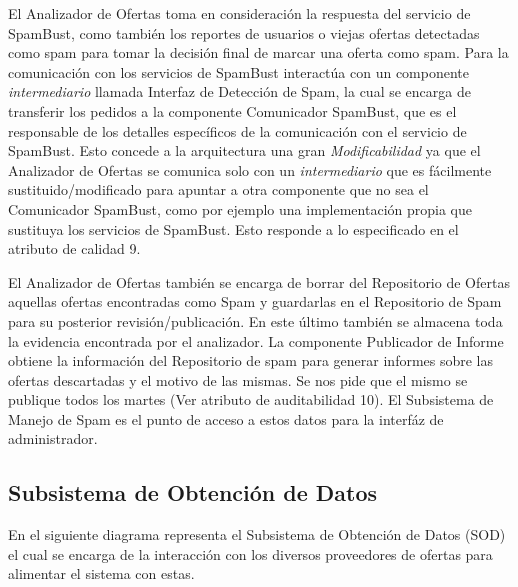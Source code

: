 El \textsf{Analizador de Ofertas} toma en consideración la respuesta del servicio de \textsf{SpamBust}, como también los reportes de usuarios o viejas ofertas detectadas como spam para tomar la decisión final de marcar una oferta como spam. Para la comunicación con los servicios de \textsf{SpamBust} interactúa con un componente \emph{intermediario} llamada \textsf{Interfaz de Detección de Spam}, la cual se encarga de transferir los pedidos a la componente \textsf{Comunicador SpamBust}, que es el responsable de los detalles específicos de la comunicación con el servicio de \textsf{SpamBust}. Esto concede a la arquitectura una gran \emph{Modificabilidad} ya que el \textsf{Analizador de Ofertas} se comunica solo con un \emph{intermediario} que es fácilmente sustituido/modificado para apuntar a otra componente que no sea el \textsf{Comunicador SpamBust}, como por ejemplo una implementación propia que sustituya los servicios de \textsf{SpamBust}. Esto responde a lo especificado en el atributo de calidad 9.
 \vspace{9pt} 


El \textsf{Analizador de Ofertas} también se encarga de borrar del \textsf{Repositorio de Ofertas} aquellas ofertas encontradas como Spam y guardarlas en el \textsf{Repositorio de Spam} para su posterior revisión/publicación. En este último también se almacena toda la evidencia encontrada por el \textsf{analizador}. La componente \textsf{Publicador de Informe} obtiene la información del \textsf{Repositorio de spam} para generar informes sobre las ofertas descartadas y el motivo de las mismas. Se nos pide que el mismo se publique todos los martes (Ver atributo de auditabilidad 10). El \textsf{Subsistema de Manejo de Spam} es el punto de acceso a estos datos para la \textsf{interfáz de administrador}.
 \vspace{9pt} 



\subsection{Subsistema de Obtención de Datos}


En el siguiente diagrama representa el Subsistema de Obtención de Datos (\textsf{SOD}) el cual se encarga de la interacción con los diversos proveedores de ofertas para alimentar el sistema con estas.
 \vspace{9pt} 


